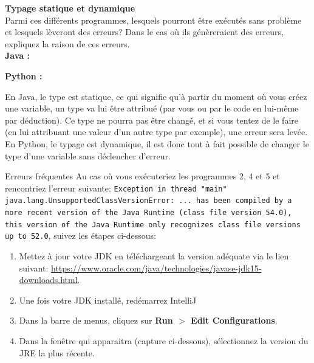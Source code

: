 \begin{Exercice}[10 minutes]  \textbf{Typage statique et dynamique}\\
    
    Parmi ces différents programmes, lesquels pourront être exécutés sans problème et lesquels lèveront des erreurs? Dans le cas où ils génèreraient des erreurs, expliquez la raison de ces erreurs.\\
    
    \textbf{Java :}
    
     
    
    \textbf{Python :}
    
     
    

    \begin{conseil}
    
        En Java, le type est statique, ce qui signifie qu'à partir du moment où vous créez une variable, un type va lui être attribué (par vous ou par le code en lui-même par déduction). Ce type ne pourra pas être changé, et si vous tentez de le faire (en lui attribuant une valeur d'un autre type par exemple), une erreur sera levée. \\

En Python, le typage est dynamique, il est donc tout à fait possible de changer le type d'une variable sans déclencher d'erreur. \\

    \end{conseil}

    \begin{Example}{\faExclamationTriangle \quad Erreurs fréquentes}
        Au cas où vous exécuteriez les programmes 2, 4 et 5 et rencontriez l'erreur suivante: \lstinline{Exception in thread "main" java.lang.UnsupportedClassVersionError: ... has been compiled by a more recent version of the Java Runtime (class file version 54.0), this version of the Java Runtime only recognizes class file versions up to 52.0}, suivez les étapes ci-dessous:
        \begin{enumerate}
            \item Mettez à jour votre JDK en téléchargeant la version adéquate via le lien suivant: \url{https://www.oracle.com/java/technologies/javase-jdk15-downloads.html}.
            \item Une fois votre JDK installé, redémarrez IntelliJ
            \item Dans la barre de menus, cliquez sur \textbf{Run $>$ Edit Configurations}.
            \item Dans la fenêtre qui apparaitra (capture ci-dessous), sélectionnez la version du JRE la plus récente.
        \end{enumerate}
        

\end{Example}
\end{Exercice}
